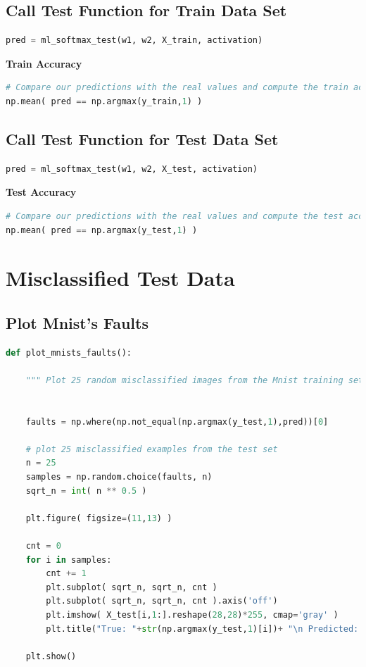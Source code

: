 \documentclass[11pt]{article}
\begin{document}
\subsection{Call Test Function for Train Data Set}

\begin{lstlisting}[language = Python]
pred = ml_softmax_test(w1, w2, X_train, activation)
\end{lstlisting}


\noindent \textbf{Train Accuracy}
\begin{lstlisting}[language = Python]
# Compare our predictions with the real values and compute the train accuracy of the model
np.mean( pred == np.argmax(y_train,1) )
\end{lstlisting}

\bigskip

\subsection{Call Test Function for Test Data Set}

\begin{lstlisting}[language = Python]
pred = ml_softmax_test(w1, w2, X_test, activation)
\end{lstlisting} 
\hfill

\noindent \textbf{Test Accuracy}
\begin{lstlisting}[language = Python]
# Compare our predictions with the real values and compute the test accuracy of the model
np.mean( pred == np.argmax(y_test,1) )
\end{lstlisting}

\hfill


\section{Misclassified Test Data}

\subsection{Plot Mnist's Faults}
\begin{lstlisting}[language = Python]
def plot_mnists_faults():
    
    """ Plot 25 random misclassified images from the Mnist training set. """  

    
    faults = np.where(np.not_equal(np.argmax(y_test,1),pred))[0]

    # plot 25 misclassified examples from the test set
    n = 25
    samples = np.random.choice(faults, n)
    sqrt_n = int( n ** 0.5 )

    plt.figure( figsize=(11,13) )

    cnt = 0
    for i in samples:
        cnt += 1
        plt.subplot( sqrt_n, sqrt_n, cnt )
        plt.subplot( sqrt_n, sqrt_n, cnt ).axis('off')
        plt.imshow( X_test[i,1:].reshape(28,28)*255, cmap='gray' )
        plt.title("True: "+str(np.argmax(y_test,1)[i])+ "\n Predicted: "+ str(pred[i]))

    plt.show()
\end{lstlisting}
\end{document}
